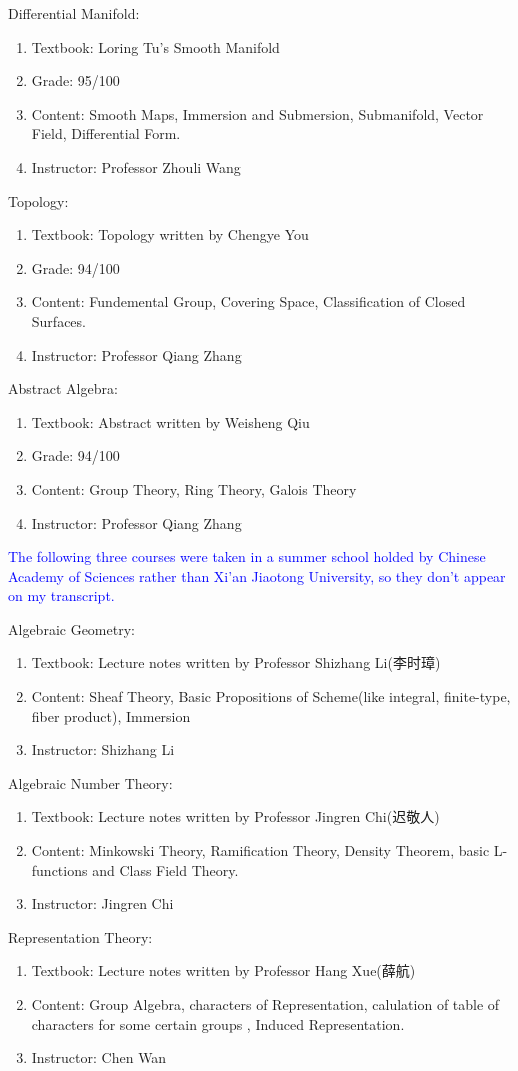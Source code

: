 \documentclass[12pt]{article}
\newcommand{\blue}[1]{\textcolor{blue}{#1}}
\newenvironment{enu}{\begin{enumerate}[(1)]}{\end{enumerate}}
\theoremstyle{definition}
\begin{document}
Differential Manifold: 
\begin{enu}
    \item Textbook: Loring Tu's Smooth Manifold 
    \item Grade: 95/100
    \item Content: Smooth Maps, Immersion and Submersion, Submanifold, Vector Field, Differential Form. 
    \item Instructor: Professor Zhouli Wang
\end{enu}

Topology: 
\begin{enu}
    \item Textbook: Topology written by Chengye You
    \item Grade: 94/100
    \item Content: Fundemental Group, Covering Space, Classification of Closed Surfaces.
    \item Instructor: Professor Qiang Zhang

\end{enu}

Abstract Algebra: 
\begin{enu}
    \item Textbook: Abstract written by Weisheng Qiu
    \item Grade: 94/100
    \item Content: Group Theory, Ring Theory, Galois Theory
    \item Instructor: Professor Qiang Zhang

\end{enu}


\blue{The following three courses were taken in a summer school holded by Chinese
Academy of Sciences rather than Xi'an Jiaotong University, so they don't appear on my transcript.} 

Algebraic Geometry: 
\begin{enu}
    \item Textbook: Lecture notes written by Professor Shizhang Li(李时璋)
    \item Content: Sheaf Theory, Basic Propositions of Scheme(like integral, finite-type, fiber product), Immersion
    \item Instructor: Shizhang Li
\end{enu}

Algebraic Number Theory: 
\begin{enu}
    \item Textbook: Lecture notes written by Professor Jingren Chi(迟敬人) 
    \item Content: Minkowski Theory, Ramification Theory, Density Theorem, 
    basic L-functions and Class Field Theory.
    \item Instructor: Jingren Chi
\end{enu}

Representation Theory: 
\begin{enu}
    \item Textbook: Lecture notes written by Professor Hang Xue(薛航) 
    \item Content: Group Algebra, characters of Representation, calulation of table of characters for some certain groups 
    , Induced Representation.
    \item Instructor: Chen Wan
\end{enu}
\end{document}

